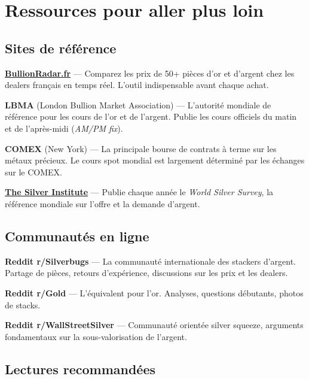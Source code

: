 \documentclass[14pt,a4paper]{extarticle}
\begin{document}
\newpage

\section*{Ressources pour aller plus loin}

\subsection*{Sites de référence}

\href{https://bullionradar.fr}{\textbf{BullionRadar.fr}} --- Comparez les prix de 50+ pièces d'or et d'argent chez les dealers français en temps réel. L'outil indispensable avant chaque achat.

\textbf{LBMA} (London Bullion Market Association) --- L'autorité mondiale de référence pour les cours de l'or et de l'argent. Publie les cours officiels du matin et de l'après-midi (\textit{AM/PM fix}).

\textbf{COMEX} (New York) --- La principale bourse de contrats à terme sur les métaux précieux. Le cours spot mondial est largement déterminé par les échanges sur le COMEX.

\href{https://silverinstitute.org}{\textbf{The Silver Institute}} --- Publie chaque année le \textit{World Silver Survey}, la référence mondiale sur l'offre et la demande d'argent.

\subsection*{Communautés en ligne}

\textbf{Reddit r/Silverbugs} --- La communauté internationale des stackers d'argent. Partage de pièces, retours d'expérience, discussions sur les prix et les dealers.

\textbf{Reddit r/Gold} --- L'équivalent pour l'or. Analyses, questions débutants, photos de stacks.

\textbf{Reddit r/WallStreetSilver} --- Communauté orientée silver squeeze, arguments fondamentaux sur la sous-valorisation de l'argent.

\subsection*{Lectures recommandées}
\end{document}

